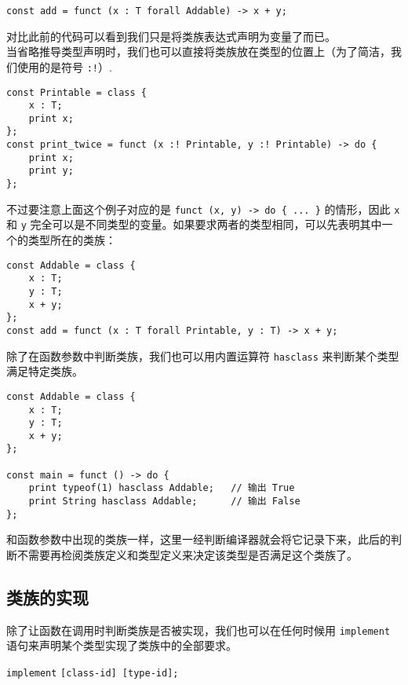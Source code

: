 \begin{lstlisting}
const add = funct (x : T forall Addable) -> x + y;
\end{lstlisting}

对比此前的代码可以看到我们只是将类族表达式声明为变量了而已。 \\

当省略推导类型声明时，我们也可以直接将类族放在类型的位置上（为了简洁，我们使用的是符号 \lstinline|:!|）.

\begin{lstlisting}
const Printable = class {
	x : T;
	print x;
};
const print_twice = funct (x :! Printable, y :! Printable) -> do {
	print x;
	print y;
};
\end{lstlisting}

不过要注意上面这个例子对应的是 \lstinline!funct (x, y) -> do { ... }! 的情形，因此 \lstinline!x! 和 \lstinline!y! 完全可以是不同类型的变量。如果要求两者的类型相同，可以先表明其中一个的类型所在的类族：

\begin{lstlisting}
const Addable = class { 
	x : T;
	y : T;
	x + y;
};
const add = funct (x : T forall Printable, y : T) -> x + y;
\end{lstlisting}

除了在函数参数中判断类族，我们也可以用内置运算符 \lstinline!hasclass! 来判断某个类型满足特定类族。

\begin{lstlisting}
const Addable = class {
	x : T;
	y : T;
	x + y;
};

const main = funct () -> do {
	print typeof(1) hasclass Addable;	// 输出 True
	print String hasclass Addable;		// 输出 False
};
\end{lstlisting}

和函数参数中出现的类族一样，这里一经判断编译器就会将它记录下来，此后的判断不需要再检阅类族定义和类型定义来决定该类型是否满足这个类族了。

\subsection{类族的实现}

除了让函数在调用时判断类族是否被实现，我们也可以在任何时候用 \lstinline!implement! 语句来声明某个类型实现了类族中的全部要求。

\begin{grammar} \label{grm:implement-statement}
	\lstinline!implement! \texttt{[class-id] [type-id];}
\end{grammar}

